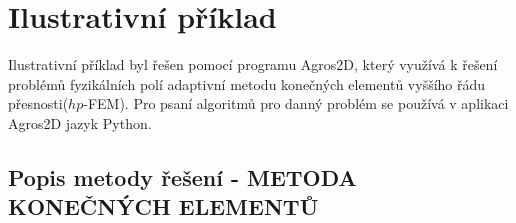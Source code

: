 \chapter{Ilustrativní příklad} 
\label{ilustrativni_priklad}
Ilustrativní příklad byl řešen pomocí programu Agros2D, který využívá k řešení problémů fyzikálních polí adaptivní metodu konečných elementů vyššího řádu přesnosti($hp$-FEM). Pro psaní algoritmů pro danný problém se používá v aplikaci Agros2D jazyk Python.
\section{Popis metody řešení - METODA KONEČNÝCH ELEMENTŮ}
